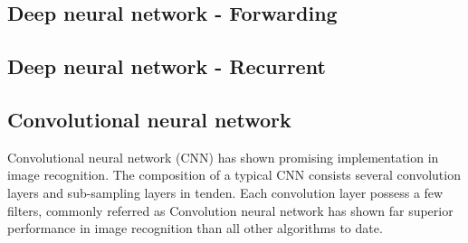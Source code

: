 \subsection{Deep neural network - Forwarding}
\subsection{Deep neural network - Recurrent}
\subsection{Convolutional neural network}
Convolutional neural network (CNN) has shown promising implementation in image recognition. The composition of a typical CNN consists several convolution layers and sub-sampling layers in tenden. Each convolution layer possess a few filters, commonly referred as  
Convolution neural network has shown far superior performance in image recognition than all other algorithms to date.~\cite{Szegedy_2015}